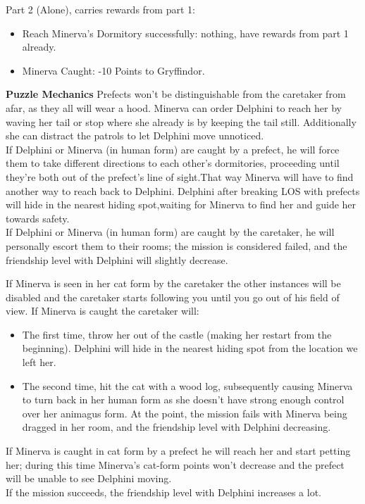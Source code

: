 Part 2 (Alone), carries rewards from part 1:

\begin{itemize}
	\item Reach Minerva's Dormitory successfully: nothing, have rewards from part 1 already.
	\item Minerva Caught: -10 Points to Gryffindor.
\end{itemize}


\textbf{Puzzle Mechanics} 
Prefects won't be distinguishable from the caretaker from afar, as they all will wear a hood. Minerva can order Delphini to reach her by waving her tail or stop where she already is by keeping the tail still. Additionally she can distract the patrols to let Delphini move unnoticed. \\

If Delphini or Minerva (in human form) are caught by a prefect, he will force them to take different directions to each other's dormitories, proceeding until they're both out of the prefect's line of sight.That way Minerva will have to find another way to reach back to Delphini. Delphini after breaking LOS with prefects will hide in the nearest hiding spot,waiting for Minerva to find her and guide her towards safety.\\

If Delphini or Minerva (in human form) are caught by the caretaker, he will personally escort them to their rooms; the mission is considered failed, and the friendship level with Delphini will slightly decrease.\\


If Minerva is seen in her cat form by the caretaker the other instances will be disabled and the caretaker starts following you until you go out of his field of view.
If Minerva is caught the caretaker will: \\

\begin{itemize}
    \item The first time, throw her out of the castle (making her restart from the beginning). Delphini will hide in the nearest hiding spot from the location we left her.
    \item The second time, hit the cat with a wood log, subsequently causing Minerva to turn back in her human form as she doesn't have strong enough control over her animagus form. At the point, the mission fails with Minerva being dragged in her room, and the friendship level with Delphini decreasing.
\end{itemize}
If Minerva is caught in cat form by a prefect he will reach her and start petting her; during this time Minerva's cat-form points won't decrease and the prefect will be unable to see Delphini moving.\\

If the mission succeeds, the friendship level with Delphini increases a lot.
\pagebreak

